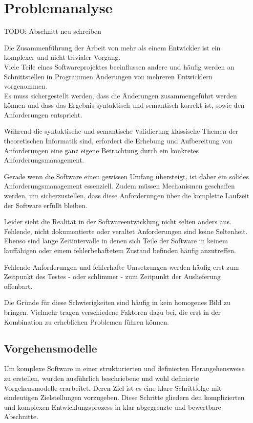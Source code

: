 \chapter{Problemanalyse}

TODO: Abschnitt neu schreiben

Die Zusammenführung der Arbeit von mehr als einem Entwickler ist ein komplexer und nicht trivialer Vorgang. \\
Viele Teile eines Softwareprojektes beeinflussen andere und häufig werden an Schnittstellen in Programmen Änderungen von mehreren Entwicklern vorgenommen. \\
Es muss sichergestellt werden, dass die Änderungen zusammengeführt werden können und dass das Ergebnis syntaktisch und semantisch korrekt ist, sowie den Anforderungen entspricht.

Während die syntaktische und semantische Validierung klassische Themen der theoretischen Informatik sind, erfordert die Erhebung und Aufbereitung von Anforderungen eine ganz eigene Betrachtung durch ein konkretes Anforderungsmanagement.

Gerade wenn die Software einen gewissen Umfang übersteigt, ist daher ein solides Anforderungsmanagement essenziell. Zudem müssen Mechanismen geschaffen werden, um sicherzustellen, dass diese Anforderungen über die komplette Laufzeit der Software erfüllt bleiben. 

Leider sieht die Realität in der Softwareentwicklung nicht selten anders aus. Fehlende, nicht dokumentierte oder veraltet Anforderungen sind keine Seltenheit.\\
Ebenso sind lange Zeitintervalle in denen sich Teile der Software in keinem lauffähigen oder einem fehlerbehaftetem Zustand befinden häufig anzutreffen.

Fehlende Anforderungen und fehlerhafte Umsetzungen werden häufig erst zum Zeitpunkt des Testes - oder schlimmer - zum Zeitpunkt der Auslieferung offenbart.

Die Gründe für diese Schwierigkeiten sind häufig in kein homogenes Bild zu bringen. Vielmehr tragen verschiedene Faktoren dazu bei, die erst in der Kombination zu erheblichen Problemen führen können.

\section{Vorgehensmodelle}

Um komplexe Software in einer strukturierten und definierten Herangehensweise zu erstellen, wurden ausführlich
beschriebene und wohl definierte Vorgehensmodelle erarbeitet. Deren Ziel ist es eine klare Schrittfolge mit 
eindeutigen Zielstellungen vorzugeben. Diese Schritte gliedern den komplizierten und komplexen Entwicklungsprozess 
in klar abgegrenzte und bewertbare Abschnitte. 

